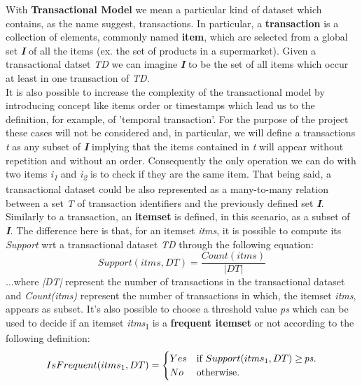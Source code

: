 \documentclass[]{report}
\begin{document}
	With \textbf{Transactional Model} we mean a particular kind of dataset which contains, as the name suggest, transactions. In particular, a \textbf{transaction} is a collection of elements, commonly named \textbf{item}, which are selected from a global set \textbf{\textit{I}} of all the items (ex. the set of products in a supermarket). Given a transactional datset \textit{TD} we can imagine \textbf{\textit{I}} to be the set of all items which occur at least in one transaction of \textit{TD}.
	\\ It is also possible to increase the complexity of the transactional model by introducing concept like items order or timestamps which lead us to the definition, for example, of 'temporal transaction'. For the purpose of the project these cases will not be considered and, in particular, we will define a transactions \textit{t} as any subset of \textbf{\textit{I}} implying that the items contained in \textit{t} will appear without repetition and without an order. Consequently the only operation we can do with two items \textit{i\textsubscript{1}} and \textit{i\textsubscript{2}} is to check if they are the same item. That being said, a transactional dataset could be also represented as a many-to-many relation between a set \textit{T} of transaction identifiers and the previously defined set \textbf{\textit{I}}.  \\ 
	Similarly to a transaction, an \textbf{itemset} is defined, in this scenario, as a subset of \textbf{\textit{I}}. The difference here is that, for an itemset \textit{itms}, it is possible to compute its \textit{Support} wrt a transactional dataset \textit{TD} through the following equation:
	\vspace{0mm}\\
	\begin{equation}
	Support(itms, DT) = \frac{Count(itms)}{|DT|} 
	\end{equation}    
	...where \textit{|DT|} represent the number of transactions in the transactional dataset and \textit{Count(itms)} represent the number of transactions in which, the itemset \textit{itms}, appears as subset. It's also possible to choose a threshold value \textit{ps} which can be used to decide if an itemset \textit{itms}\textsubscript{1} is a \textbf{frequent itemset} or not according to the following definition:
	\vspace{0mm}\\
	\begin{equation}
		IsFrequent(itms\textsubscript{1}, DT)=\begin{cases}
			Yes & \text{if $Support(itms\textsubscript{1}, DT) \geq\, $\textit{ps}}.\\
			No & \text{otherwise}.
		\end{cases}
	\end{equation} 
\end{document}
